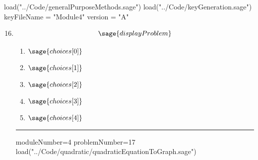 \documentclass[14pt]{article}
\newcommand{\litem}[1]{\item#1\hspace*{-1cm}\rule{\textwidth}{0.4pt}}
\begin{document}
\pagestyle{fancy}

\begin{sagesilent}
load("../Code/generalPurposeMethods.sage")
load("../Code/keyGeneration.sage")
keyFileName = "Module4"
version = "A"
\end{sagesilent}

\begin{enumerate}
\setcounter{enumi}{15}


\begin{sagesilent}
moduleNumber=4
problemNumber=16
load("../Code/quadratic/quadraticFormula.sage")
\end{sagesilent}

\litem{ 
	\[ \sage{displayProblem} \]

	\begin{enumerate}[label=\Alph*.]
    \item \( \sage{choices[0]} \)
    \item \( \sage{choices[1]} \)
    \item \( \sage{choices[2]} \)
    \item \( \sage{choices[3]} \)
    \item \( \sage{choices[4]} \)
	\end{enumerate}
}

\begin{sagesilent}
moduleNumber=4
problemNumber=17
load("../Code/quadratic/quadraticEquationToGraph.sage")
\end{sagesilent}


\end{enumerate}
\end{document}
